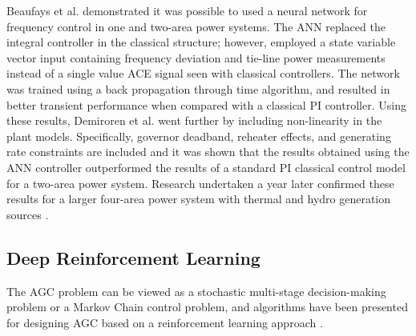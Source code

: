 Beaufays et al. \cite{Beaufays1994} demonstrated it was possible to used a neural network for frequency control in one and two-area power systems. The ANN replaced the integral controller in the classical structure; however, employed a state variable vector input containing frequency deviation and tie-line power measurements instead of a single value ACE signal seen with classical controllers. The network was trained using a back propagation through time algorithm, and resulted in better transient performance when compared with a classical PI controller. Using these results, Demiroren et al. \cite{Demiroren2001} went further by including non-linearity in the plant models. Specifically, governor deadband, reheater effects, and generating rate constraints are included and it was shown that the results obtained using the ANN controller outperformed the results of a standard PI classical control model for a two-area power system. Research undertaken a year later confirmed these results for a larger four-area power system with thermal and hydro generation sources \cite{Zeynelgil2002}. 


\subsection{Deep Reinforcement Learning}\label{drl}

The AGC problem can be viewed as a stochastic multi-stage decision-making problem or a Markov Chain control problem, and algorithms have been presented for designing AGC based on a reinforcement learning approach \cite{Ahamed2002}.





%